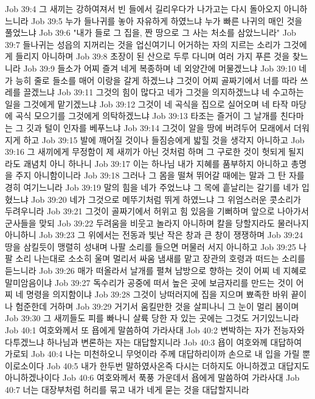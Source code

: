 Job 39:4  그 새끼는 강하여져서 빈 들에서 길리우다가 나가고는 다시 돌아오지 아니하느니라
Job 39:5  누가 들나귀를 놓아 자유하게 하였느냐 누가 빠른 나귀의 매인 것을 풀었느냐
Job 39:6  "내가 들로 그 집을, 짠 땅으로 그 사는 처소를 삼았느니라"
Job 39:7  들나귀는 성읍의 지꺼리는 것을 업신여기니 어거하는 자의 지르는 소리가 그것에게 들리지 아니하며
Job 39:8  초장이 된 산으로 두루 다니며 여러 가지 푸른 것을 찾느니라
Job 39:9  들소가 어찌 즐겨 네게 복종하며 네 외양간에 머물겠느냐
Job 39:10  네가 능히 줄로 들소를 매어 이랑을 갈게 하겠느냐 그것이 어찌 골짜기에서 너를 따라 쓰레를 끌겠느냐
Job 39:11  그것의 힘이 많다고 네가 그것을 의지하겠느냐 네 수고하는 일을 그것에게 맡기겠느냐
Job 39:12  그것이 네 곡식을 집으로 실어오며 네 타작 마당에 곡식 모으기를 그것에게 의탁하겠느냐
Job 39:13  타조는 즐거이 그 날개를 친다마는 그 깃과 털이 인자를 베푸느냐
Job 39:14  그것이 알을 땅에 버려두어 모래에서 더워지게 하고
Job 39:15  발에 깨어질 것이나 들짐승에게 밟힐 것을 생각지 아니하고
Job 39:16  그 새끼에게 무정함이 제 새끼가 아닌 것처럼 하며 그 구로한 것이 헛되게 될지라도 괘념치 아니 하나니
Job 39:17  이는 하나님 내가 지혜를 품부하지 아니하고 총명을 주지 아니함이니라
Job 39:18  그러나 그 몸을 떨쳐 뛰어갈 때에는 말과 그 탄 자를 경히 여기느니라
Job 39:19  말의 힘을 네가 주었느냐 그 목에 흩날리는 갈기를 네가 입혔느냐
Job 39:20  네가 그것으로 메뚜기처럼 뛰게 하였느냐 그 위엄스러운 콧소리가 두려우니라
Job 39:21  그것이 골짜기에서 허위고 힘 있음을 기뻐하며 앞으로 나아가서 군사들을 맞되
Job 39:22  두려움을 비웃고 놀라지 아니하며 칼을 당할지라도 물러나지 아니하니
Job 39:23  그 위에서는 전동과 빛난 작은 창과 큰 창이 쟁쟁하며
Job 39:24  땅을 삼킬듯이 맹렬히 성내며 나팔 소리를 들으면 머물러 서지 아니하고
Job 39:25  나팔 소리 나는대로 소소히 울며 멀리서 싸움 냄새를 맡고 장관의 호령과 떠드는 소리를 듣느니라
Job 39:26  매가 떠올라서 날개를 펼쳐 남방으로 향하는 것이 어찌 네 지혜로 말미암음이냐
Job 39:27  독수리가 공중에 떠서 높은 곳에 보금자리를 만드는 것이 어찌 네 명령을 의지함이냐
Job 39:28  그것이 낭떠러지에 집을 지으며 뾰족한 바위 끝이나 험준한데 거하며
Job 39:29  거기서 움킬만한 것을 살피나니 그 눈이 멀리 봄이며
Job 39:30  그 새끼들도 피를 빠나니 살륙 당한 자 있는 곳에는 그것도 거기있느니라
Job 40:1  여호와께서 또 욥에게 말씀하여 가라사대
Job 40:2  변박하는 자가 전능자와 다투겠느냐 하나님과 변론하는 자는 대답할지니라
Job 40:3  욥이 여호와께 대답하여 가로되
Job 40:4  나는 미천하오니 무엇이라 주께 대답하리이까 손으로 내 입을 가릴 뿐이로소이다
Job 40:5  내가 한두번 말하였사온즉 다시는 더하지도 아니하겠고 대답지도 아니하겠나이다
Job 40:6  여호와께서 푹풍 가운데서 욥에게 말씀하여 가라사대
Job 40:7  너는 대장부처럼 허리를 묶고 내가 네게 묻는 것을 대답할지니라
